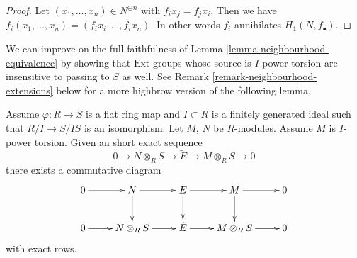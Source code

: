 \begin{proof}
Let $(x_1, \ldots, x_n) \in N^{\oplus n}$ with $f_i x_j = f_j x_i$.
Then we have $f_i(x_1, \ldots, x_n) = (f_i x_i, \ldots, f_i x_n)$.
In other words $f_i$ annihilates $H_1(N, f_\bullet)$.
\end{proof}

\noindent
We can improve on the full faithfulness of
Lemma \ref{lemma-neighbourhood-equivalence}
by showing that $\text{Ext}$-groups whose source is $I$-power torsion
are insensitive to passing to $S$ as well. See
Remark \ref{remark-neighbourhood-extensions}
below for a more highbrow version of the following lemma.

\begin{lemma}
\label{lemma-neighbourhood-extensions}
Assume $\varphi : R \to S$ is a flat ring map and $I \subset R$ is a
finitely generated ideal such that $R/I \to S/IS$ is an isomorphism.
Let $M$, $N$ be $R$-modules. Assume $M$ is $I$-power torsion.
Given an short exact sequence
$$
0 \to N \otimes_R S \to \tilde E \to M \otimes_R S \to 0
$$
there exists a commutative diagram
$$
\xymatrix{
0 \ar[r] &
N \ar[r] \ar[d] &
E \ar[r] \ar[d] &
M \ar[r] \ar[d] &
0 \\
0 \ar[r] &
N \otimes_R S \ar[r] &
\tilde E \ar[r] &
M \otimes_R S \ar[r] &
0
}
$$
with exact rows.
\end{lemma}

